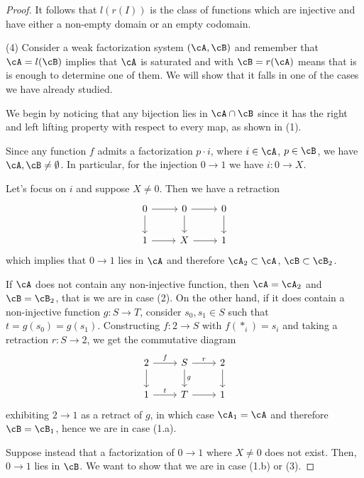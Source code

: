 \documentclass[a4paper,11pt,openany]{scrartcl}
\begin{document}
\begin{proof}
    It follows that $l(r(I))$ is the class of functions which are
    injective and have either a non-empty domain or an empty codomain.

    (4) Consider a weak factorization system $(\cA,\cB)$ and remember that
    $\cA=l(\cB)$ implies that $\cA$ is saturated and with $\cB=r(\cA)$ means
    that is is enough to determine one of them. We will show that it
    falls in one of the cases we have already studied.

    We begin by noticing that any bijection
    lies in $\cA\cap\cB$ since it has the right and left lifting property with
    respect to every map, as shown in (1).

    Since any function $f$ admits a factorization
    $p\cdot i$, where $i\in\cA$, $p\in\cB$, we have $\cA,\cB\neq\emptyset$. In
    particular, for the injection $0\rightarrow 1$ we have $i\colon 0\rightarrow
    X$.

    Let's focus on $i$ and suppose $X\neq 0$. Then we have a retraction
    \[\begin{tikzcd}
	{0} & {0} & {0} \\
	{1} & {X} & {1}
	\arrow[from=1-1, to=1-2]
	\arrow[from=1-2, to=1-3]
	\arrow[from=1-1, to=2-1]
	\arrow[from=1-2, to=2-2]
	\arrow[from=1-3, to=2-3]
	\arrow[from=2-2, to=2-3]
	\arrow[from=2-1, to=2-2]
    \end{tikzcd}\]
    which implies that $0\rightarrow 1$ lies in $\cA$ and therefore
    $\cA_2\subset\cA$, $\cB\subset\cB_2$.

    If $\cA$ does not contain any non-injective function, then $\cA=\cA_2$ and
    $\cB=\cB_2$, that is we are in case (2). On the other hand, if it does
    contain a non-injective function
    $g\colon S\rightarrow T$, consider $s_0,s_1\in S$ such that
    $t=g(s_0)=g(s_1)$. Constructing $f\colon 2\rightarrow S$ with $f(*_i)=s_i$
    and taking a retraction $r\colon S\rightarrow 2$, we get the commutative
    diagram
    \[\begin{tikzcd}
	{2} & {S} & {2} \\
	{1} & {T} & {1}
	\arrow["f", from=1-1, to=1-2]
	\arrow["r", from=1-2, to=1-3]
	\arrow[from=1-1, to=2-1]
	\arrow["g", from=1-2, to=2-2]
	\arrow[from=1-3, to=2-3]
	\arrow[from=2-2, to=2-3]
	\arrow["t", from=2-1, to=2-2]
    \end{tikzcd}\]
    exhibiting $2\rightarrow 1$ as a retract of $g$, in which case $\cA_1=\cA$
    and therefore $\cB=\cB_1$, hence we are in case (1.a).

    Suppose instead that a factorization of $0\rightarrow 1$ where $X\neq 0$
    does not exist. Then, $0\rightarrow 1$ lies in $\cB$. We want to show that
    we are in case (1.b) or (3).


\end{proof}
\end{document}
